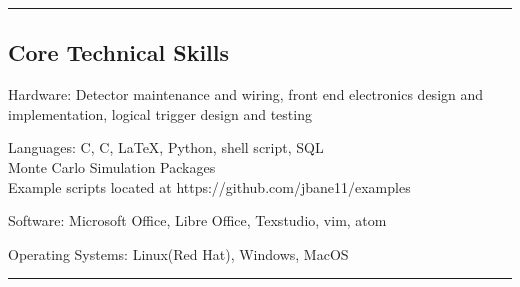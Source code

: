 \documentclass[12pt,letterpaper]{article}
\newenvironment{indentsection}[1]%
{\begin{list}{}%
	{\setlength{\leftmargin}{#1}}%
	\item[]%
}
{\end{list}}
\newcommand{\CPP}
{C\nolinebreak[4]\hspace{-.05em}\raisebox{.22ex}{\footnotesize\bf ++}}
\begin{document}
\hrule
\vspace{-0.4em}
\subsection*{Core Technical Skills}

\begin{indentsection}{\parindent}
\begin{description*}
	\item[Hardware:]
	Detector maintenance and wiring, front end electronics design and implementation, logical trigger design and testing   
	\item[Languages:]
	C, \CPP, \LaTeX, Python, shell script, SQL \\
	Monte Carlo Simulation Packages\\
	Example scripts located at https://github.com/jbane11/examples
	\item[Software:]
	Microsoft Office, Libre Office, Texstudio, vim, atom
	\item[Operating Systems:]
	Linux(Red Hat), Windows, MacOS
	
\end{description*}
\end{indentsection}
\hrule
\end{document}
